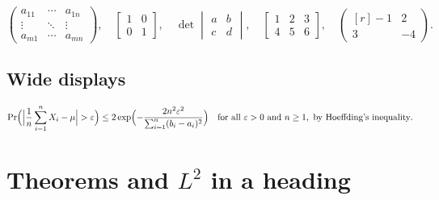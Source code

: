 \documentclass[11pt,letterpaper]{article}
\theoremstyle{definition}
\theoremstyle{remark}
\begin{document}
\[ \begin{pmatrix} a_{11} & \cdots & a_{1n} \\ \vdots & \ddots & \vdots \\ a_{m1} & \cdots & a_{mn} \end{pmatrix}, \quad \begin{bmatrix} 1 & 0 \\ 0 & 1 \end{bmatrix}, \quad \det \begin{vmatrix} a & b \\ c & d \end{vmatrix}, \quad \left[ \begin{array}{cc|c} 1 & 2 & 3 \\ \hline 4 & 5 & 6 \end{array} \right], \quad \begin{pmatrix*}[r] -1 & 2 \\ 3 & -4 \end{pmatrix*}. \]

\subsection{Wide displays}

\[ \Pr\Bigl( \Bigl\lvert \frac{1}{n} \sum_{i=1}^n X_i - \mu \Bigr\rvert > \varepsilon \Bigr) \leq 2 \exp\Bigl( -\frac{2 n^2 \varepsilon^2}{\sum_{i=1}^n (b_i - a_i)^2} \Bigr) \quad \text{for all } \varepsilon > 0 \text{ and } n \geq 1, \text{ by Hoeffding's inequality}. \]


\section{Theorems and \texorpdfstring{$L^2$}{L2} in a heading}
\end{document}
